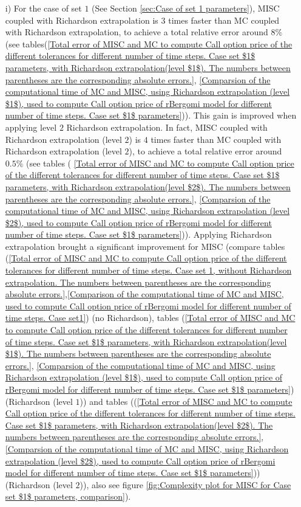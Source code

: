 \begin{enumerate}
		
		\item [i)] For the case of set $1$ (See Section \ref{sec:Case of set 1 parameters}), MISC coupled with Richardson extrapolation  is $3$ times faster than MC coupled with Richardson extrapolation, to achieve a total relative error around $8\%$  (see  tables(\ref{Total  error of MISC and MC to compute Call option price of the different tolerances for different number of time steps. Case set $1$ parameters, with Richardson extrapolation(level $1$). The numbers between parentheses are the corresponding absolute errors.}, \ref{Comparsion of the computational time of  MC and MISC, using Richardson extrapolation (level $1$), used to compute Call option price of rBergomi model for different number of time steps. Case set $1$ parameters})). This gain is improved when applying level $2$ Richardson extrapolation. In fact,  MISC coupled with Richardson extrapolation (level $2$) is $4$ times faster than MC coupled with Richardson extrapolation (level $2$), to achieve a total relative error around $0.5\%$ (see  tables  ( \ref{Total  error of MISC and MC to compute Call option price of the different tolerances for different number of time steps. Case set $1$ parameters, with Richardson extrapolation(level $2$). The numbers between parentheses are the corresponding absolute errors.}, \ref{Comparsion of the computational time of  MC and MISC, using Richardson extrapolation (level $2$), used to compute Call option price of rBergomi model for different number of time steps. Case set $1$ parameters})).  Applying Richardson extrapolation brought a significant improvement for MISC (compare tables (\ref{Total error of MISC and MC to compute Call option price of the different tolerances for different number of time steps. Case set 1, without Richardson extrapolation. The numbers between parentheses are the corresponding absolute errors.},\ref{Comparison of the computational time of  MC and MISC, used to compute Call option price of rBergomi model for different number of time steps. Case set1}) (no Richardson), tables (\ref{Total  error of MISC and MC to compute Call option price of the different tolerances for different number of time steps. Case set $1$ parameters, with Richardson extrapolation(level $1$). The numbers between parentheses are the corresponding absolute errors.}, \ref{Comparsion of the computational time of  MC and MISC, using Richardson extrapolation (level $1$), used to compute Call option price of rBergomi model for different number of time steps. Case set $1$ parameters}) (Richardson (level $1$)) and  tables ((\ref{Total  error of MISC and MC to compute Call option price of the different tolerances for different number of time steps. Case set $1$ parameters, with Richardson extrapolation(level $2$). The numbers between parentheses are the corresponding absolute errors.}, \ref{Comparsion of the computational time of  MC and MISC, using Richardson extrapolation (level $2$), used to compute Call option price of rBergomi model for different number of time steps. Case set $1$ parameters})) (Richardson (level $2$)), also see  figure \ref{fig:Complexity plot for  MISC for Case set $1$ parameters, comparison}).
		

\end{enumerate}
